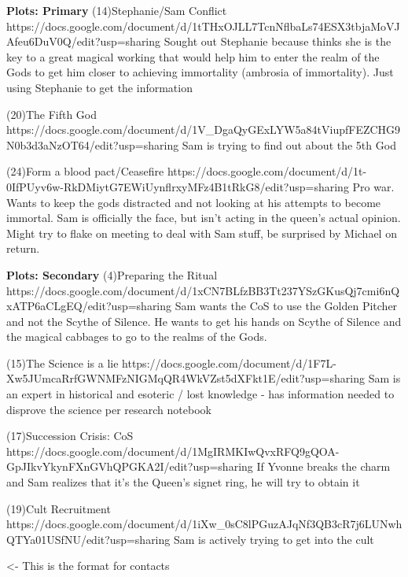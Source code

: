 \documentclass[char]{GL2020}
\begin{document}
\textbf{Plots: Primary}
(14)Stephanie/Sam Conflict
https://docs.google.com/document/d/1tTHxOJLL7TcnNflbaLs74ESX3tbjaMoVJAfeu6DuV0Q/edit?usp=sharing
Sought out Stephanie because thinks she is the key to a great magical working that would help him to enter the realm of the Gods to get him closer to achieving immortality (ambrosia of immortality).  Just using Stephanie to get the information

(20)The Fifth God
https://docs.google.com/document/d/1V_DgaQyGExLYW5a84tViupfFEZCHG9N0b3d3aNzOT64/edit?usp=sharing
Sam is trying to find out about the 5th God

(24)Form a blood pact/Ceasefire
https://docs.google.com/document/d/1t-0IfPUyv6w-RkDMiytG7EWiUynflrxyMFz4B1tRkG8/edit?usp=sharing
Pro war. Wants to keep the gods distracted and not looking at his attempts to become immortal. Sam is officially the face, but isn’t acting in the queen’s actual opinion. Might try to flake on meeting to deal with Sam stuff, be surprised by Michael on return.


\textbf{Plots: Secondary}
(4)Preparing the Ritual
https://docs.google.com/document/d/1xCN7BLfzBB3Tt237YSzGKusQj7cmi6nQxATP6aCLgEQ/edit?usp=sharing
Sam wants the CoS to use the Golden Pitcher and not the Scythe of Silence.  He wants to get his hands on Scythe of Silence and the magical cabbages to go to the realms of the Gods.

(15)The Science is a lie
https://docs.google.com/document/d/1F7L-Xw5JUmcaRrfGWNMFzNIGMqQR4WkVZst5dXFkt1E/edit?usp=sharing
Sam is an expert in historical and esoteric / lost knowledge - has information needed to disprove the science per research notebook

(17)Succession Crisis: CoS
https://docs.google.com/document/d/1MgIRMKIwQvxRFQ9gQOA-GpJIkvYkynFXnGVhQPGKA2I/edit?usp=sharing
If Yvonne breaks the charm and Sam realizes that it’s the Queen’s signet ring, he will try to obtain it

(19)Cult Recruitment
https://docs.google.com/document/d/1iXw_0sC8lPGuzAJqNf3QB3cR7j6LUNwhQTYa01USfNU/edit?usp=sharing
Sam is actively trying to get into the cult

\begin{itemz}[Goals]
	\item 
\end{itemz}

\begin{itemz}[Notes]
	\item 
\end{itemz}

\begin{contacts}
	\contact{\cTest{}} <- This is the format for contacts 
\end{contacts}
\end{document}

